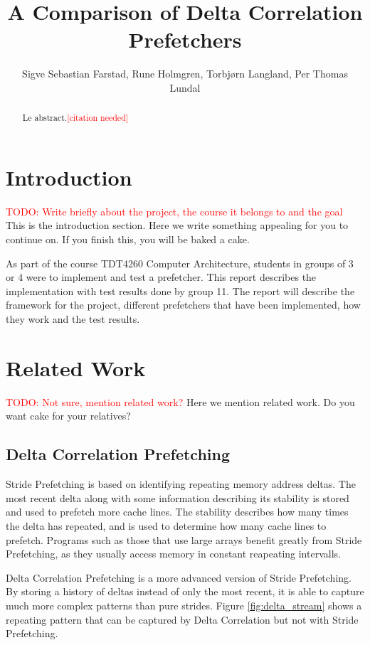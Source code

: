 \documentclass[a4paper]{IEEEtran}
\title{A Comparison of Delta Correlation Prefetchers}
\author{
    Sigve Sebastian Farstad,
    Rune Holmgren,
    Torbjørn Langland,
    Per Thomas Lundal
}
\newcommand\TODO[1]{\textcolor{red}{TODO:#1}}
\newcommand\todo[1]{\TODO{#1}}
\newcommand\cn{\textcolor{red}{[citation needed]}}
\begin{document}
\maketitle

\begin{abstract}
    Le abstract.\cn
\end{abstract}

\section{Introduction}

\todo{ Write briefly about the project, the course it belongs to and the goal}
This is the introduction section.
Here we write something appealing for you to continue on.
If you finish this, you will be baked a cake.

As part of the course TDT4260 Computer Architecture, students in groups of 3 or 4 were to implement and test a prefetcher.
This report describes the implementation with test results done by group 11.
The report will describe the framework for the project, different prefetchers that have been implemented, how they work and the test results.

\section{Related Work}

\todo{ Not sure, mention related work?}
Here we mention related work. Do you want cake for your relatives?

\subsection{Delta Correlation Prefetching}

Stride Prefetching is based on identifying repeating memory address deltas.
The most recent delta along with some information describing its stability is stored and used to prefetch more cache lines.
The stability describes how many times the delta has repeated, and is used to determine how many cache lines to prefetch.
Programs such as those that use large arrays benefit greatly from Stride Prefetching, as they usually access memory in constant reapeating intervalls.

Delta Correlation Prefetching is a more advanced version of Stride Prefetching.
By storing a history of deltas instead of only the most recent, it is able to capture much more complex patterns than pure strides.
Figure \ref{fig:delta_stream} shows a repeating pattern that can be captured by Delta Correlation but not with Stride Prefetching.
\end{document}
